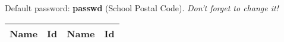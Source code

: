 \documentclass[12pt,a4paper,justified]{tufte-exam}
\begin{document}
  \begin{large}
	\begin{fullwidth}  
      Default password: \textbf{passwd} (School Postal Code).
      \textit{Don't forget to change it!} \\  
    \end{fullwidth}
  \end{large}
  
\begin{tabular}{l l l l}
  Name & Id & Name & Id \\
  \hline
\end{tabular}
\end{document}
